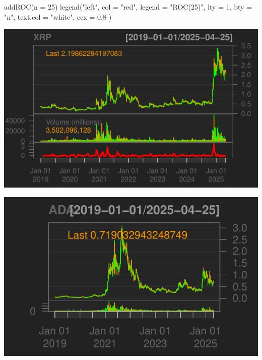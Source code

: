 \documentclass[]{tufte-handout}
\newenvironment{Shaded}{}{}
\newcommand{\AttributeTok}[1]{\textcolor[rgb]{0.49,0.56,0.16}{#1}}
\newcommand{\DecValTok}[1]{\textcolor[rgb]{0.25,0.63,0.44}{#1}}
\newcommand{\FloatTok}[1]{\textcolor[rgb]{0.25,0.63,0.44}{#1}}
\newcommand{\FunctionTok}[1]{\textcolor[rgb]{0.02,0.16,0.49}{#1}}
\newcommand{\NormalTok}[1]{#1}
\newcommand{\OtherTok}[1]{\textcolor[rgb]{0.00,0.44,0.13}{#1}}
\newcommand{\SpecialCharTok}[1]{\textcolor[rgb]{0.25,0.44,0.63}{#1}}
\newcommand{\StringTok}[1]{\textcolor[rgb]{0.25,0.44,0.63}{#1}}
\begin{document}
\begin{Shaded}
\begin{Highlighting}[]
\FunctionTok{addROC}\NormalTok{(}\AttributeTok{n =} \DecValTok{25}\NormalTok{)}
\FunctionTok{legend}\NormalTok{(}\StringTok{"left"}\NormalTok{,}
  \AttributeTok{col =} \StringTok{"red"}\NormalTok{, }\AttributeTok{legend =} \StringTok{"ROC(25)"}\NormalTok{, }\AttributeTok{lty =} \DecValTok{1}\NormalTok{, }\AttributeTok{bty =} \StringTok{"n"}\NormalTok{,}
  \AttributeTok{text.col =} \StringTok{"white"}\NormalTok{, }\AttributeTok{cex =} \FloatTok{0.8}
\NormalTok{)}
\end{Highlighting}
\end{Shaded}

\includegraphics{cripto_update_files/figure-latex/unnamed-chunk-12-8}

\begin{Shaded}
\end{Shaded}

\includegraphics{cripto_update_files/figure-latex/unnamed-chunk-12-9}
\end{document}
